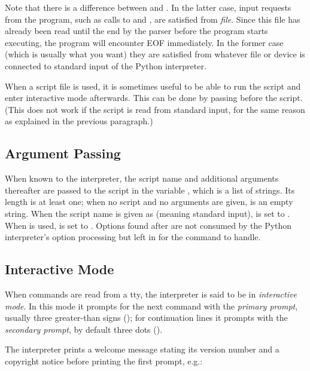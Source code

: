 \documentclass{manual}
\begin{document}
Note that there is a difference between  and
.  In the latter case, input requests from the
program, such as calls to  and , are
satisfied from \emph{file}.  Since this file has already been read
until the end by the parser before the program starts executing, the
program will encounter EOF immediately.  In the former case (which is
usually what you want) they are satisfied from whatever file or device
is connected to standard input of the Python interpreter.

When a script file is used, it is sometimes useful to be able to run
the script and enter interactive mode afterwards.  This can be done by
passing  before the script.  (This does not work if the script
is read from standard input, for the same reason as explained in the
previous paragraph.)

\subsection{Argument Passing \label{argPassing}}

When known to the interpreter, the script name and additional
arguments thereafter are passed to the script in the variable
, which is a list of strings.  Its length is at least
one; when no script and no arguments are given,  is
an empty string.  When the script name is given as  (meaning 
standard input),  is set to .  When  is used,  is set to .  Options
found after  are not consumed by the Python
interpreter's option processing but left in  for the
command to handle.

\subsection{Interactive Mode \label{interactive}}

When commands are read from a tty, the interpreter is said to be in
\emph{interactive mode}.  In this mode it prompts for the next command
with the \emph{primary prompt}, usually three greater-than signs
(\samp{>>> }); for continuation lines it prompts with the
\emph{secondary prompt},
by default three dots ().  

The interpreter prints a welcome message stating its version number
and a copyright notice before printing the first prompt, e.g.:
\end{document}
